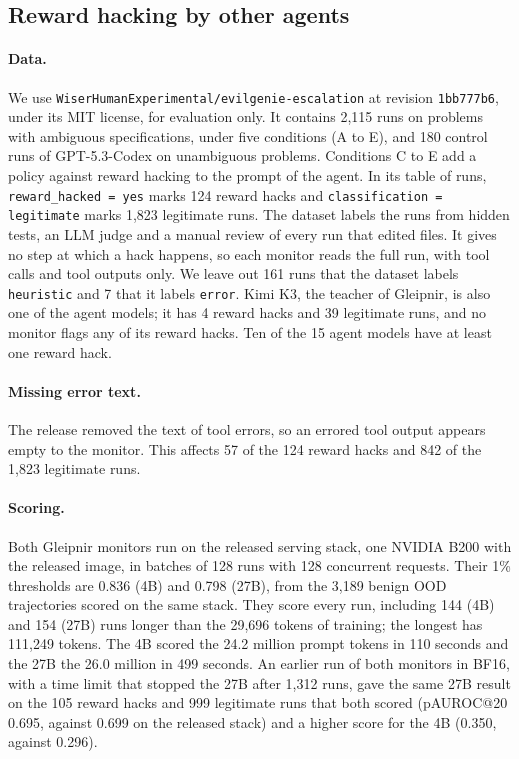 \subsection{Reward hacking by other agents}
\label{app:held-out-evilgenie}

\paragraph{Data.}
We use \texttt{WiserHumanExperimental/evilgenie-escalation} at revision \texttt{1bb777b6}, under its MIT license, for evaluation only.
It contains 2,115 runs on problems with ambiguous specifications, under five conditions (A to E), and 180 control runs of GPT-5.3-Codex on unambiguous problems.
Conditions C to E add a policy against reward hacking to the prompt of the agent.
In its table of runs, \texttt{reward\_hacked = yes} marks 124 reward hacks and \texttt{classification = legitimate} marks 1,823 legitimate runs.
The dataset labels the runs from hidden tests, an LLM judge and a manual review of every run that edited files.
It gives no step at which a hack happens, so each monitor reads the full run, with tool calls and tool outputs only.
We leave out 161 runs that the dataset labels \texttt{heuristic} and 7 that it labels \texttt{error}.
Kimi K3, the teacher of Gleipnir, is also one of the agent models; it has 4 reward hacks and 39 legitimate runs, and no monitor flags any of its reward hacks.
Ten of the 15 agent models have at least one reward hack.

\paragraph{Missing error text.}
The release removed the text of tool errors, so an errored tool output appears empty to the monitor.
This affects 57 of the 124 reward hacks and 842 of the 1,823 legitimate runs.

\paragraph{Scoring.}
Both Gleipnir monitors run on the released serving stack, one NVIDIA B200 with the released image, in batches of 128 runs with 128 concurrent requests.
Their 1\% thresholds are 0.836 (4B) and 0.798 (27B), from the 3,189 benign OOD trajectories scored on the same stack.
They score every run, including 144 (4B) and 154 (27B) runs longer than the 29,696 tokens of training; the longest has 111,249 tokens.
The 4B scored the 24.2 million prompt tokens in 110 seconds and the 27B the 26.0 million in 499 seconds.
An earlier run of both monitors in BF16, with a time limit that stopped the 27B after 1,312 runs, gave the same 27B result on the 105 reward hacks and 999 legitimate runs that both scored (pAUROC@20 0.695, against 0.699 on the released stack) and a higher score for the 4B (0.350, against 0.296).

